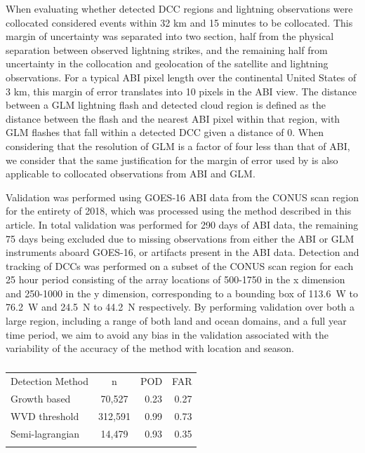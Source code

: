 \documentclass[amt, manuscript]{copernicus}
\begin{document}
When evaluating whether detected DCC regions and lightning observations were collocated \citet{muller_novel_2019} considered events within 32 \unit{km} and 15 minutes to be collocated.
This margin of uncertainty was separated into two section, half from the physical separation between observed lightning strikes, and the remaining half from uncertainty in the collocation and geolocation of the satellite and lightning observations.
For a typical ABI pixel length over the continental United States of 3 \unit{km}, this margin of error translates into 10 pixels in the ABI view.
The distance between a GLM lightning flash and detected cloud region is defined as the distance between the flash and the nearest ABI pixel within that region, with GLM flashes that fall within a detected DCC given a distance of 0.
When considering that the resolution of GLM is a factor of four less than that of ABI, we consider that the same justification for the margin of error used by \citet{muller_novel_2019} is also applicable to collocated observations from ABI and GLM.

Validation was performed using GOES-16 ABI data from the CONUS scan region for the entirety of 2018, which was processed using the method described in this article.
In total validation was performed for 290 days of ABI data, the remaining 75 days being excluded due to missing observations from either the ABI or GLM instruments aboard GOES-16, or artifacts present in the ABI data.
Detection and tracking of DCCs was performed on a subset of the CONUS scan region for each 25 hour period consisting of the array locations of 500-1750 in the x dimension and 250-1000 in the y dimension, corresponding to a bounding box of 113.6~\degree W to 76.2~\degree W and 24.5~\degree N to 44.2~\degree N respectively.
By performing validation over both a large region, including a range of both land and ocean domains, and a full year time period, we aim to avoid any bias in the validation associated with the variability of the accuracy of the method with location and season.

\begin{table}[t]
\caption{}
\label{table:validation}
\begin{tabular}{lcrr}
\tophline
Detection Method    & n         & POD       & FAR       \\ 
\middlehline
Growth based        & 70,527    & 0.23      & 0.27      \\
WVD threshold       & 312,591   & 0.99      & 0.73      \\
Semi-lagrangian     & 14,479    & 0.93      & 0.35      \\
\bottomhline
\end{tabular}
\end{table}
\end{document}
